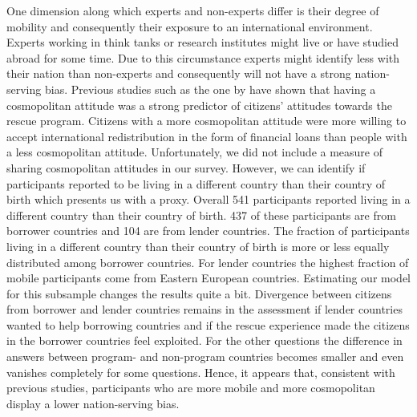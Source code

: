 One dimension along which experts and non-experts differ is their degree of mobility and consequently their exposure to an international environment. Experts working in think tanks or research institutes might live or have studied abroad for some time. Due to this circumstance experts might identify less with their nation than non-experts and consequently will not have a strong nation-serving bias. Previous studies such as the one by \cite{bechtel} have shown that having a cosmopolitan attitude was a strong predictor of citizens' attitudes towards the rescue program. Citizens with a more cosmopolitan attitude were more willing to accept international redistribution in the form of financial loans than people with a less cosmopolitan attitude. Unfortunately, we did not include a measure of sharing cosmopolitan attitudes in our survey. However, we can identify if participants reported to be living in a different country than their country of birth which presents us with a proxy. Overall 541 participants reported living in a different country than their country of birth. 437 of these participants are from borrower countries and 104 are from lender countries. The fraction of participants living in a different country than their country of birth is more or less equally distributed among borrower countries. For lender countries the highest fraction of mobile participants come from Eastern European countries. Estimating our model for this subsample changes the results quite a bit. Divergence between citizens from borrower and lender countries remains in the assessment if lender countries wanted to help borrowing countries and if the rescue experience made the citizens in the borrower countries feel exploited. For the other questions the difference in answers between program- and non-program countries becomes smaller and even vanishes completely for some questions. Hence, it appears that, consistent with previous studies, participants who are more mobile and more cosmopolitan display a lower nation-serving bias.  \\

